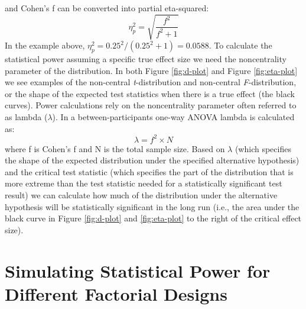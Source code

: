 \documentclass[,jou, draftfirst, a4paper,floatsintext]{apa6}
\begin{document}
and Cohen's f can be converted into partial eta-squared:
\begin{equation}
\eta_p^2 = \sqrt{\frac{f^2}{f^2+1}} \label{eq:f-to-eta}
\end{equation}
In the example above, \(\eta_p^2 = 0.25^2/(0.25^2+1) = 0.0588\).
To calculate the statistical power assuming a specific true effect size we need the noncentrality parameter of the distribution.
In both Figure \ref{fig:d-plot} and Figure \ref{fig:eta-plot} we see examples of the non-central \emph{t}-distribution and non-central \emph{F}-distribution, or the shape of the expected test statistics when there is a true effect (the black curves).
Power calculations rely on the noncentrality parameter often referred to as lambda (\(\lambda\)). In a between-participants one-way ANOVA lambda is calculated as:
\begin{equation}
\lambda = f^2 \times N \label{eq:lambda}
\end{equation}
where f is Cohen's f and N is the total sample size.
Based on \(\lambda\) (which specifies the shape of the expected distribution under the specified alternative hypothesis) and the critical test statistic (which specifies the part of the distribution that is more extreme than the test statistic needed for a statistically significant test result) we can calculate how much of the distribution under the alternative hypothesis will be statistically significant in the long run (i.e., the area under the black curve in Figure \ref{fig:d-plot} and \ref{fig:eta-plot} to the right of the critical effect size).

\hypertarget{simulating-statistical-power-for-different-factorial-designs}{%
\section{Simulating Statistical Power for Different Factorial Designs}\label{simulating-statistical-power-for-different-factorial-designs}}
\end{document}
